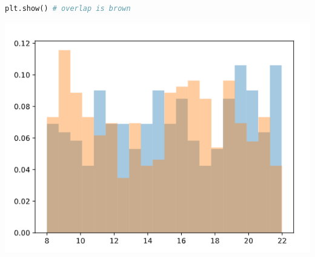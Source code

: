 \documentclass[11pt, a4paper]{article}
\begin{document}
\begin{spacing}{1.1}
\begin{minipage}[c]{9cm}
\begin{lstlisting}[language=Python]
	plt.show() # overlap is brown \end{lstlisting}\vspace*{1mm}
	\end{minipage}
	\begin{minipage}[c]{9cm}
	\includegraphics[scale=.48]{multhist}
	\end{minipage} \newpage

\end{spacing}
\end{document}
